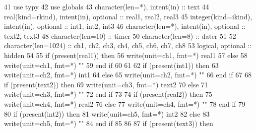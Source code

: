 \begin{DoxyCode}
41     \textcolor{keywordtype}{use }typy
42     \textcolor{keywordtype}{use }globals
43     \textcolor{keywordtype}{character(len=*)}, \textcolor{keywordtype}{intent(in)} :: text
44     \textcolor{keywordtype}{real(kind=rkind)}, \textcolor{keywordtype}{intent(in)}, \textcolor{keywordtype}{optional} :: real1, real2, real3
45     \textcolor{keywordtype}{integer(kind=ikind)}, \textcolor{keywordtype}{intent(in)}, \textcolor{keywordtype}{optional} :: int1, int2, int3
46     \textcolor{keywordtype}{character(len=*)}, \textcolor{keywordtype}{intent(in)}, \textcolor{keywordtype}{optional} :: text2, text3
48     \textcolor{keywordtype}{character(len=10)} :: timer
50     \textcolor{keywordtype}{character(len=8)} :: dater
51 
52     \textcolor{keywordtype}{character(len=1024)} :: ch1, ch2, ch3, ch4, ch5, ch6, ch7, ch8
53     \textcolor{keywordtype}{logical}, \textcolor{keywordtype}{optional} :: hidden
54 
55     \textcolor{keywordflow}{if} (\textcolor{keyword}{present}(real1)) \textcolor{keywordflow}{then}
56       \textcolor{keyword}{write}(unit=ch1, fmt=*) real1
57     \textcolor{keywordflow}{else}
58       \textcolor{keyword}{write}(unit=ch1, fmt=*) \textcolor{stringliteral}{""}
59 \textcolor{keywordflow}{    end if}
60 
61 
62     \textcolor{keywordflow}{if} (\textcolor{keyword}{present}(int1)) \textcolor{keywordflow}{then}
63       \textcolor{keyword}{write}(unit=ch2, fmt=*) int1
64     \textcolor{keywordflow}{else}
65       \textcolor{keyword}{write}(unit=ch2, fmt=*) \textcolor{stringliteral}{""}
66 \textcolor{keywordflow}{    end if}
67 
68     \textcolor{keywordflow}{if} (\textcolor{keyword}{present}(text2)) \textcolor{keywordflow}{then}
69       \textcolor{keyword}{write}(unit=ch3, fmt=*) text2
70     \textcolor{keywordflow}{else}
71       \textcolor{keyword}{write}(unit=ch3, fmt=*) \textcolor{stringliteral}{""}
72 \textcolor{keywordflow}{    end if}
73 
74     \textcolor{keywordflow}{if} (\textcolor{keyword}{present}(real2)) \textcolor{keywordflow}{then}
75       \textcolor{keyword}{write}(unit=ch4, fmt=*) real2
76     \textcolor{keywordflow}{else}
77       \textcolor{keyword}{write}(unit=ch4, fmt=*) \textcolor{stringliteral}{""}
78 \textcolor{keywordflow}{    end if}
79 
80     \textcolor{keywordflow}{if} (\textcolor{keyword}{present}(int2)) \textcolor{keywordflow}{then}
81       \textcolor{keyword}{write}(unit=ch5, fmt=*) int2
82     \textcolor{keywordflow}{else}
83       \textcolor{keyword}{write}(unit=ch5, fmt=*) \textcolor{stringliteral}{""}
84 \textcolor{keywordflow}{    end if}
85 
86     
87     \textcolor{keywordflow}{if} (\textcolor{keyword}{present}(text3)) \textcolor{keywordflow}{then}

\end{DoxyCode}
